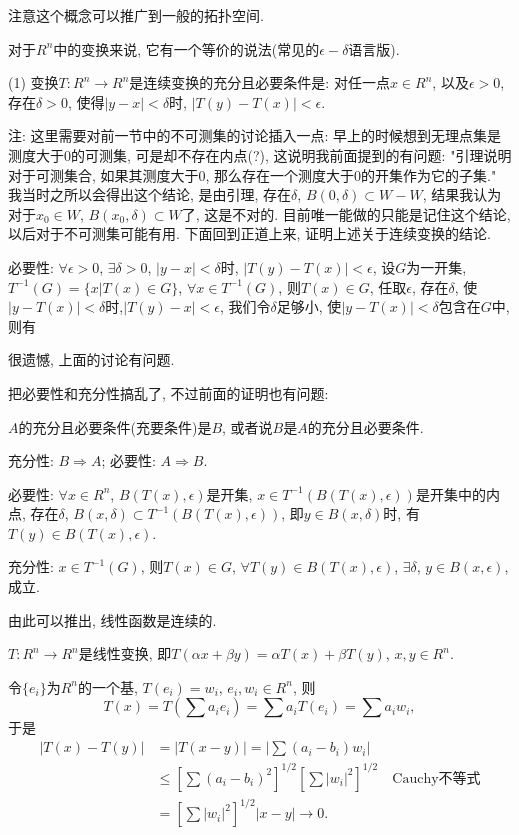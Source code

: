 \documentclass[12pt,a4paper,openany]{book}
\begin{document}
注意这个概念可以推广到一般的拓扑空间.

对于$R^n$中的变换来说, 它有一个等价的说法(常见的$\epsilon-\delta$语言版). 

(1) 变换$T: R^n \rightarrow R^n$是连续变换的充分且必要条件是: 对任一点$x \in R^n$, 以及$\epsilon > 0$, 存在$\delta > 0$, 使得$|y - x| < \delta$时, $|T(y) - T(x)| < \epsilon$.

注: 这里需要对前一节中的不可测集的讨论插入一点: 早上的时候想到无理点集是测度大于0的可测集, 可是却不存在内点(?), 这说明我前面提到的有问题:
"引理说明对于可测集合, 如果其测度大于0, 那么存在一个测度大于0的开集作为它的子集." 我当时之所以会得出这个结论, 是由引理, 存在$\delta$, $B(0, \delta) \subset W - W$, 结果我认为对于$x_0 \in W$, $B(x_0, \delta) \subset W$了, 这是不对的. 目前唯一能做的只能是记住这个结论, 以后对于不可测集可能有用. 下面回到正道上来, 证明上述关于连续变换的结论.

必要性: $\forall \epsilon > 0$, $\exists \delta > 0$, $|y - x| < \delta$时, $|T(y) - T(x)| < \epsilon$, 设$G$为一开集, $T^{-1}(G) = \{x | T(x) \in G\}$, $\forall x \in T^{-1}(G)$, 则$T(x) \in G$, 任取$\epsilon$, 存在$\delta$, 使$|y - T(x)| < \delta$时,$|T(y) - x| < \epsilon$, 我们令$\delta$足够小, 使$|y - T(x)| < \delta$包含在$G$中, 则有

很遗憾, 上面的讨论有问题.

把必要性和充分性搞乱了, 不过前面的证明也有问题:

$A$的充分且必要条件(充要条件)是$B$, 或者说$B$是$A$的充分且必要条件.

充分性: $B \Rightarrow A$; 必要性: $A \Rightarrow B$.

必要性: $\forall x \in R^n$, $B(T(x), \epsilon)$是开集, $x \in T^{-1}(B(T(x), \epsilon))$是开集中的内点, 存在$\delta$, $B(x, \delta) \subset T^{-1}(B(T(x), \epsilon))$, 即$y \in B(x, \delta)$时, 有$T(y) \in B(T(x), \epsilon)$.

充分性: $x \in T^{-1}(G)$, 则$T(x) \in G$, $\forall T(y) \in B(T(x), \epsilon)$, $\exists \delta$, $y \in B(x, \epsilon)$, 成立.

由此可以推出, 线性函数是连续的.

$T:R^n \rightarrow R^n$是线性变换, 即$T(\alpha{x} + \beta{y}) = \alpha{T(x)} + \beta{T(y)}$, $x, y \in R^n$.

令$\{e_i\}$为$R^n$的一个基, $T(e_i) = w_i$, $e_i, w_i \in R^n$, 则
\[
T(x) = T(\sum{a_ie_i}) = \sum{a_iT(e_i)} = \sum{a_iw_i},
\]
于是
\[
\begin{aligned}
|T(x) - T(y)| &= |T(x - y)| = |\sum{(a_i - b_i)w_i}|\\ 
&\le [\sum{(a_i - b_i)^2}]^{1/2}[\sum{|w_i|^2}]^{1/2} \quad \text{Cauchy不等式}\\
&= [\sum{|w_i|^2}]^{1/2}|x - y| \rightarrow 0.
\end{aligned}
\]
\end{document}
